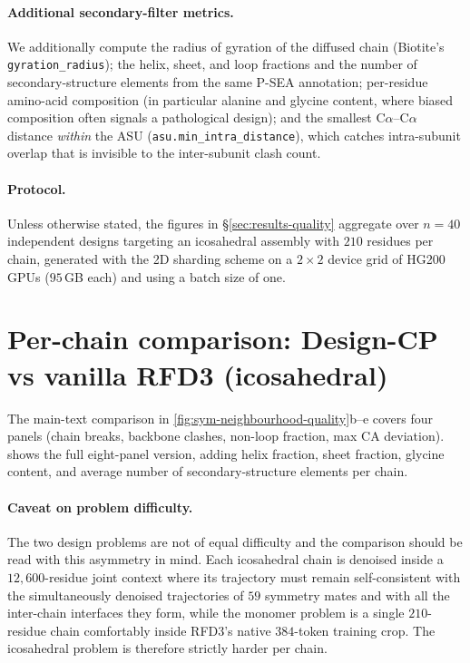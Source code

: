 \documentclass{article}
\theoremstyle{plain}
\theoremstyle{definition}
\theoremstyle{remark}
\begin{document}
\paragraph{Additional secondary-filter metrics.} We additionally compute the radius of gyration of the diffused chain (Biotite's \texttt{gyration\_radius}); the helix, sheet, and loop fractions and the number of secondary-structure elements from the same P-SEA annotation; per-residue amino-acid composition (in particular alanine and glycine content, where biased composition often signals a pathological design); and the smallest C$\alpha$--C$\alpha$ distance \emph{within} the ASU (\texttt{asu.min\_intra\_distance}), which catches intra-subunit overlap that is invisible to the inter-subunit clash count.

\paragraph{Protocol.} Unless otherwise stated, the figures in \S\ref{sec:results-quality} aggregate over $n=40$ independent designs targeting an icosahedral assembly with $210$ residues per chain, generated with the 2D sharding scheme on a $2\times 2$ device grid of HG200 GPUs ($95$\,GB each) and using a batch size of one.


\section{Per-chain comparison: Design-CP vs vanilla RFD3 (icosahedral)}
\label{app:vanilla-rfd3-vs-designcp}

The main-text comparison in \cref{fig:sym-neighbourhood-quality}b--e covers four panels (chain breaks, backbone clashes, non-loop fraction, max CA deviation).  shows the full eight-panel version, adding helix fraction, sheet fraction, glycine content, and average number of secondary-structure elements per chain.

\paragraph{Caveat on problem difficulty.} The two design problems are not of equal difficulty and the comparison should be read with this asymmetry in mind. Each icosahedral chain is denoised inside a $12{,}600$-residue joint context where its trajectory must remain self-consistent with the simultaneously denoised trajectories of $59$ symmetry mates and with all the inter-chain interfaces they form, while the monomer problem is a single $210$-residue chain comfortably inside RFD3's native $384$-token training crop. The icosahedral problem is therefore strictly harder per chain.
\end{document}
